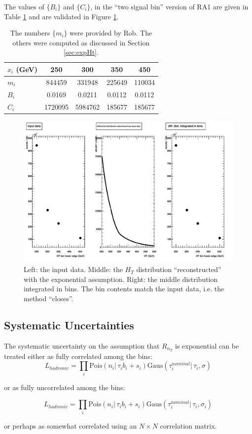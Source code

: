 The values of $\{B_i\}$ and $\{C_i\}$, in the ``two signal bin'' version of RA1 are given in Table \ref{tab:bsandcs}
and are validated in Figure \ref{fig:validationPlots}.
\begin{table}[hb]
  \begin{tabular}{| l | c c c c |}
    \hline
    $x_i$ (GeV) & 250 & 300 & 350 & 450 \\
    \hline
    $m_i$ & 844459 & 331948 & 225649 & 110034 \\
    $B_i$ & 0.0169 & 0.0211 & 0.0112 & 0.0112 \\
    $C_i$ & 1720095 & 5984762 & 185677 & 185677 \\
    \hline
  \end{tabular}
  \caption{The numbers $\{m_i\}$ were provided by Rob.  The others were computed as discussed in Section \ref{sec:expHt}.}
  \label{tab:bsandcs}
\end{table}

\begin{figure}[ht]
  \includegraphics[width=1.2\textwidth]{totalBackgroundExpHt}
  \caption{Left: the input data.
    Middle: the $H_T$ distribution ``reconstructed'' with the exponential assumption.
    Right: the middle distribution integrated in bins.  The bin contents match the input data, i.e. the method ``closes''.}
  \label{fig:validationPlots}
\end{figure}

\subsection{Systematic Uncertainties}
\label{sec:sysUnc}
The systematic uncertainty on the assumption that $R_{\alpha_T}$ is exponential can be treated either as 
fully correlated among the bins:
\begin{equation}
L_{hadronic}=\prod_i \mathrm{Pois}(n_i |\, \tau_i b_i + s_i)\mathrm{Gaus}(\tau_i^{nominal} |\,\tau_i, \sigma)
\end{equation}

or as fully uncorrelated among the bins:

\begin{equation}
L_{hadronic}=\prod_i \mathrm{Pois}(n_i |\, \tau_i b_i + s_i)\mathrm{Gaus}(\tau_i^{nominal} |\,\tau_i, \sigma_i)
\end{equation}

or perhaps as somewhat correlated using an $N \times N$ correlation matrix.

